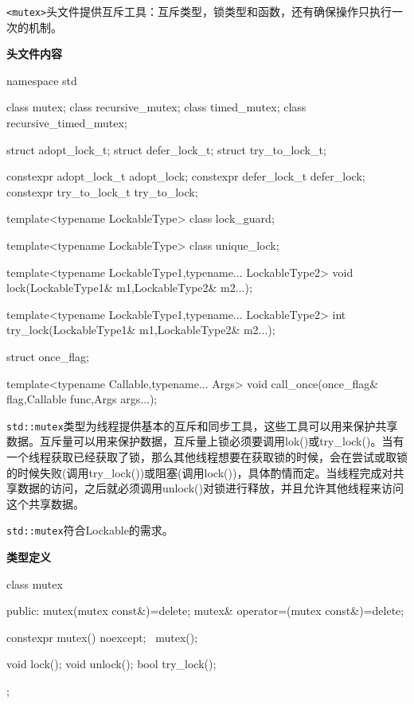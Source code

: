 
\texttt{<mutex>}头文件提供互斥工具：互斥类型，锁类型和函数，还有确保操作只执行一次的机制。

\textbf{头文件内容}

\begin{cpp}
namespace std
{
  class mutex;
  class recursive_mutex;
  class timed_mutex;
  class recursive_timed_mutex;

  struct adopt_lock_t;
  struct defer_lock_t;
  struct try_to_lock_t;

  constexpr adopt_lock_t adopt_lock{};
  constexpr defer_lock_t defer_lock{};
  constexpr try_to_lock_t try_to_lock{};

  template<typename LockableType>
  class lock_guard;

  template<typename LockableType>
  class unique_lock;

  template<typename LockableType1,typename... LockableType2>
  void lock(LockableType1& m1,LockableType2& m2...);

  template<typename LockableType1,typename... LockableType2>
  int try_lock(LockableType1& m1,LockableType2& m2...);

  struct once_flag;

  template<typename Callable,typename... Args>
  void call_once(once_flag& flag,Callable func,Args args...);
}
\end{cpp}


\texttt{std::mutex}类型为线程提供基本的互斥和同步工具，这些工具可以用来保护共享数据。互斥量可以用来保护数据，互斥量上锁必须要调用lok()或try\_lock()。当有一个线程获取已经获取了锁，那么其他线程想要在获取锁的时候，会在尝试或取锁的时候失败(调用try\_lock())或阻塞(调用lock())，具体酌情而定。当线程完成对共享数据的访问，之后就必须调用unlock()对锁进行释放，并且允许其他线程来访问这个共享数据。

\texttt{std::mutex}符合Lockable的需求。

\textbf{类型定义}

\begin{cpp}
class mutex
{
public:
  mutex(mutex const&)=delete;
  mutex& operator=(mutex const&)=delete;

  constexpr mutex() noexcept;
  ~mutex();

  void lock();
  void unlock();
  bool try_lock();
};
\end{cpp}


